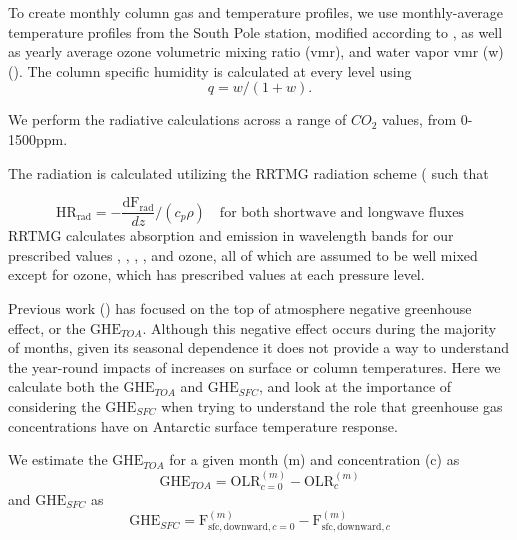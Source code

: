 \documentclass[draft]{agujournal2019}
\begin{document}
To create monthly column gas and temperature profiles, we use monthly-average temperature profiles from the South Pole station, modified according to , as well as yearly average ozone volumetric mixing ratio (vmr), and water vapor vmr (w) (\cite{schmithusen_how_2015}). The column specific humidity is calculated at every level using
\begin{equation}
    q = w/(1+w).
\end{equation}

We perform the radiative calculations across a range of $CO_2$ values, from 0-1500ppm.

The radiation is calculated utilizing the RRTMG radiation scheme (\cite{mlawer_radiative_1997} such that 

\begin{equation}
    \text{HR}_{\text{rad}} = -\frac{\text{dF}_{\text{rad}}}{dz} /(c_p \rho) \quad \text{for both shortwave and longwave fluxes}
\end{equation}
RRTMG calculates absorption and emission in wavelength bands for our prescribed values , , , , and ozone, all of which are assumed to be well mixed except for ozone, which has prescribed values at each pressure level.

Previous work (\cite{schmithusen_how_2015}) has focused on the top of atmosphere negative greenhouse effect, or the $\text{GHE}_{TOA}$. Although this negative effect occurs during the majority of months, given its seasonal dependence it does not provide a way to understand the year-round impacts of  increases on surface or column temperatures. Here we calculate both the $\text{GHE}_{TOA}$ and $\text{GHE}_{SFC}$, and look at the importance of considering the $\text{GHE}_{SFC}$ when trying to understand the role that greenhouse gas concentrations have on Antarctic surface temperature response.

We estimate the $\text{GHE}_{TOA}$ for a given month (m) and  concentration (c) as
\begin{equation}
    {\text{GHE}_{TOA}} = \text{OLR}_{c=0}^{(m)} - \text{OLR}_{c}^{(m)}
\end{equation}
and $\text{GHE}_{SFC}$ as
\begin{equation}
    {\text{GHE}_{SFC}} = \text{F}_{\text{sfc}, \text{downward}, c=0}^{(m)} - \text{F}_{\text{sfc}, \text{downward}, c}^{(m)}
\end{equation}
\end{document}
